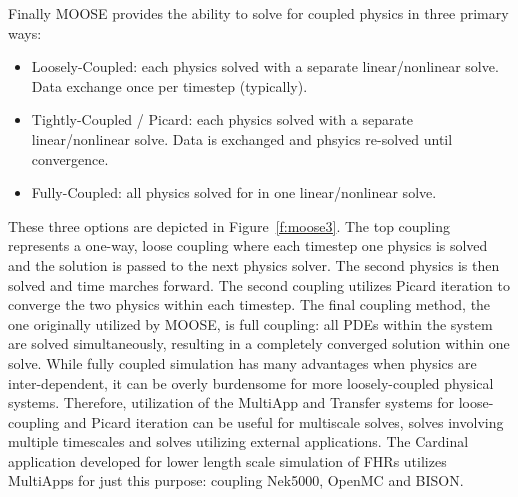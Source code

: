 Finally MOOSE provides the ability to solve for coupled physics in three primary ways:
\begin{itemize}
\item Loosely-Coupled: each physics solved with a separate linear/nonlinear solve. Data exchange once per
timestep (typically).
\item Tightly-Coupled / Picard: each physics solved with a separate linear/nonlinear solve. Data is exchanged
and phsyics re-solved until convergence.
\item Fully-Coupled: all physics solved for in one linear/nonlinear solve.
\end{itemize}
These three options are depicted in Figure~\ref{f:moose3}. The top coupling represents a one-way, loose coupling where each timestep one physics is solved and the solution is passed to the next physics solver. The second physics is then solved and time marches forward. The second coupling utilizes Picard iteration to converge the two physics within each timestep. The final coupling method, the one originally utilized by MOOSE, is full coupling: all PDEs within the system are solved simultaneously, resulting in a completely converged solution within one solve. While fully coupled simulation has many advantages when physics are inter-dependent, it can be
overly burdensome for more loosely-coupled physical systems. Therefore, utilization of the MultiApp and Transfer systems for loose-coupling and Picard iteration can be useful for multiscale solves, solves involving multiple timescales and solves utilizing external applications. The Cardinal application developed for lower length scale simulation of FHRs utilizes MultiApps for just this purpose: coupling Nek5000, OpenMC and BISON.

